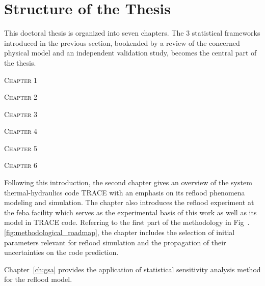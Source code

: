 \section{Structure of the Thesis}\label{sec:intro_thesis_structure}

This doctoral thesis is organized into seven chapters.
The $3$ statistical frameworks introduced in the previous section, 
bookended by a review of the concerned physical model and an independent validation study, 
becomes the central part of the thesis.

\textsc{Chapter 1}

\textsc{Chapter 2}

\textsc{Chapter 3}

\textsc{Chapter 4}

\textsc{Chapter 5}

\textsc{Chapter 6}

Following this introduction, 
the second chapter gives an overview of the system thermal-hydraulics code TRACE with an emphasis on its reflood phenomena modeling and simulation.
The chapter also introduces the reflood experiment at the \gls{feba} facility which serves as the experimental basis of this work
as well as its model in TRACE code.
Referring to the first part of the methodology in Fig~.\ref{fig:methodological_roadmap}, 
the chapter includes the selection of initial parameters relevant for reflood simulation and the propagation of their uncertainties on the code prediction.

Chapter~\ref{ch:gsa} provides the application of statistical sensitivity analysis method for the reflood model.
